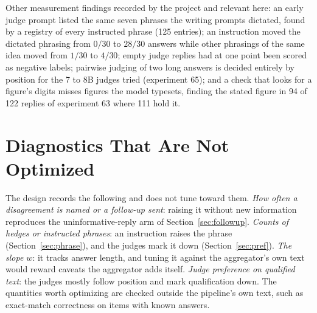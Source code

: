 \documentclass[10pt,twocolumn]{article}
\begin{document}
Other measurement findings recorded by the project and relevant here:
an early judge prompt listed the same seven phrases the writing prompts
dictated, found by a registry of every instructed phrase (125 entries);
an instruction moved the dictated phrasing from $0/30$ to $28/30$
answers while other phrasings of the same idea moved from $1/30$ to
$4/30$; empty judge replies had at one point been scored as negative
labels; pairwise judging of two long answers is decided entirely by
position for the 7 to 8B judges tried (experiment 65); and a check that
looks for a figure's digits misses figures the model typesets, finding
the stated figure in 94 of 122 replies of experiment 63 where 111 hold
it.

\section{Diagnostics That Are Not Optimized}
\label{app:charter}

The design records the following and does not tune toward them.
\emph{How often a disagreement is named or a follow-up sent}: raising
it without new information reproduces the uninformative-reply arm of
Section~\ref{sec:followup}. \emph{Counts of hedges or instructed
phrases}: an instruction raises the phrase
(Section~\ref{sec:phrase}), and the judges mark it down
(Section~\ref{sec:pref}). \emph{The slope $w$}: it tracks answer
length, and tuning it against the aggregator's own text would reward
caveats the aggregator adds itself. \emph{Judge preference on qualified
text}: the judges mostly follow position and mark qualification down.
The quantities worth optimizing are checked outside the pipeline's own
text, such as exact-match correctness on items with known answers.
\end{document}
